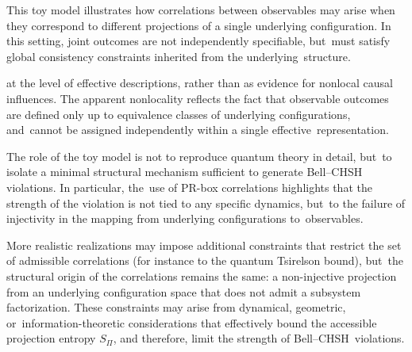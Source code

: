 \documentclass[11pt,a4paper]{article}
\theoremstyle{remark}
\begin{document}
    This toy model illustrates how correlations between observables may arise when they
    correspond to different projections of a single underlying configuration.
    In this setting, joint outcomes are not independently specifiable, but~must satisfy
    global consistency constraints inherited from the underlying~structure.

     at the level of effective descriptions, rather than as evidence
    for nonlocal causal influences.
    The apparent nonlocality reflects the fact that observable outcomes are defined only
    up to equivalence classes of underlying configurations, and~cannot be assigned
    independently within a single effective~representation.

    The role of the toy model is not to reproduce quantum theory in detail, but~to
    isolate a minimal structural mechanism sufficient to generate Bell--CHSH violations.
    In particular, the~use of PR-box correlations highlights that the strength of the
    violation is not tied to any specific dynamics, but~to the failure of injectivity
    in the mapping from underlying configurations to~observables.

    More realistic realizations may impose additional constraints that restrict the set
    of admissible correlations (for instance to the quantum Tsirelson bound), but~the
    structural origin of the correlations remains the same: a non-injective projection
    from an underlying configuration space that does not admit a subsystem factorization.
    These constraints may arise from dynamical, geometric, or~information-theoretic
    considerations that effectively bound the accessible projection entropy $S_{\Pi}$,
    and therefore, limit the strength of Bell--CHSH~violations.

  \clearpage
  
  
\end{document}
